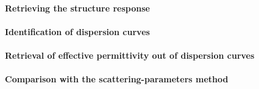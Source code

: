 \paragraph{Retrieving the structure response}
\paragraph{Identification of dispersion curves}
\paragraph{Retrieval of effective permittivity out of dispersion curves}
\paragraph{Comparison with the scattering-parameters method}



